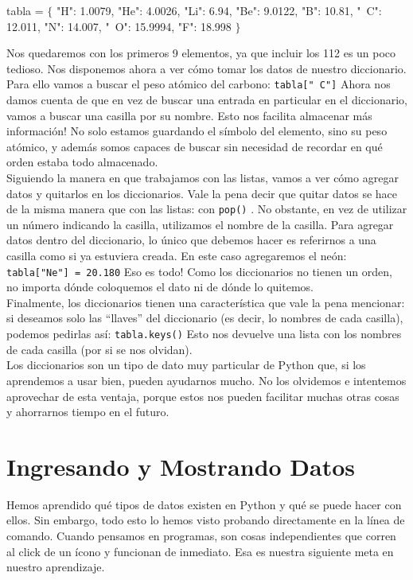 \documentclass[10pt,letterpaper]{article}
\newcommand{\inlinecode}[1]{
\colorbox{light-gray}{\texttt{#1}}
}
\newenvironment{Code}
{
\begin{lrbox}{\selvestebox}%
\begin{minipage}{\dimexpr\columnwidth-2\fboxsep\relax}
\fontfamily{\ttdefault}\selectfont
}
{\end{minipage}\end{lrbox}%
\begin{center}
\colorbox{light-gray}{\usebox{\selvestebox}}
\end{center}
}
\begin{document}
\begin{Code}
tabla = $\lbrace$ "H": 1.0079, "He": 4.0026, "Li": 6.94, "Be": 9.0122, "B": 10.81, "\ \hspace{-2mm}C": 12.011, "N": 14.007, "\ \hspace{-2mm}O": 15.9994, "F": 18.998 $\rbrace$
\end{Code}

Nos quedaremos con los primeros 9 elementos, ya que incluir los 112 es un poco tedioso. Nos disponemos ahora a ver c\'omo tomar los datos de nuestro diccionario. Para ello vamos a buscar el peso at\'omico del carbono: \inlinecode{tabla["\ \hspace{-2mm}C"]} Ahora nos damos cuenta de que en vez de buscar una entrada en particular en el diccionario, vamos a buscar una casilla por su nombre. Esto nos facilita almacenar m\'as informaci\'on! No solo estamos guardando el s\'imbolo del elemento, sino su peso at\'omico, y adem\'as somos capaces de buscar sin necesidad de recordar en qu\'e orden estaba todo almacenado.\\

Siguiendo la manera en que trabajamos con las listas, vamos a ver c\'omo agregar datos y quitarlos en los diccionarios. Vale la pena decir que quitar datos se hace de la misma manera que con las listas: con \inlinecode{pop()}. No obstante, en vez de utilizar un n\'umero indicando la casilla, utilizamos el nombre de la casilla. Para agregar datos dentro del diccionario, lo \'unico que debemos hacer es referirnos a una casilla como si ya estuviera creada. En este caso agregaremos el ne\'on: \inlinecode{tabla["Ne"] = 20.180} Eso es todo! Como los diccionarios no tienen un orden, no importa d\'onde coloquemos el dato ni de d\'onde lo quitemos.\\

Finalmente, los diccionarios tienen una caracter\'istica que vale la pena mencionar: si deseamos solo las ``llaves'' del diccionario (es decir, lo nombres de cada casilla), podemos pedirlas as\'i: \inlinecode{tabla.keys()} Esto nos devuelve una lista con los nombres de cada casilla (por si se nos olvidan).\\

Los diccionarios son un tipo de dato muy particular de Python que, si los aprendemos a usar bien, pueden ayudarnos mucho. No los olvidemos e intentemos aprovechar de esta ventaja, porque estos nos pueden facilitar muchas otras cosas y ahorrarnos tiempo en el futuro.

\section{Ingresando y Mostrando Datos}
Hemos aprendido qu\'e tipos de datos existen en Python y qu\'e se puede hacer con ellos. Sin embargo, todo esto lo hemos visto probando directamente en la l\'inea de comando. Cuando pensamos en programas, son cosas independientes que corren al click de un \'icono y funcionan de inmediato. Esa es nuestra siguiente meta en nuestro aprendizaje.\\
\end{document}
